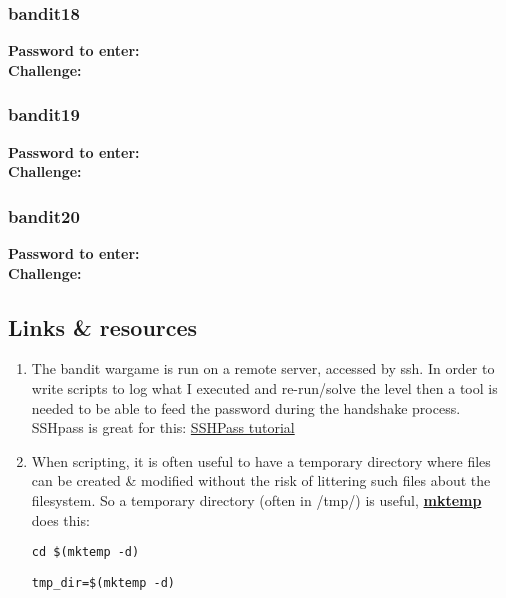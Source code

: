 \documentclass[a4paper]{article}
\newcommand{\pass}[1]{\textbf{Password to enter:} \textit{#1}\\}
\newcommand{\chall}{\textbf{Challenge:} }
\begin{document}
\subsubsection{bandit18}
\pass{ }
\chall 

\subsubsection{bandit19}
\pass{ }
\chall 

\subsubsection{bandit20}
\pass{ }
\chall 

\subsection*{Links \& resources}
\begin{enumerate}
\item The bandit wargame is run on a remote server, accessed by ssh. In order to write scripts to log what I executed and re-run/solve the level then a tool is needed to be able to feed the password during the handshake process. SSHpass is great for this: \href{https://askubuntu.com/questions/224181/how-do-i-include-a-password-with-ssh-command-want-to-make-shell-script}{SSHPass tutorial} 

\item When scripting, it is often useful to have a temporary directory where files can be created \& modified without the risk of littering such files about the filesystem. So a temporary directory (often in /tmp/) is useful, \href{https://code-maven.com/create-temporary-directory-on-linux-using-bash}{\textbf{mktemp}} does this:
	\begin{lstlisting}[title=move to the new temporary directory]
	cd $(mktemp -d)
	\end{lstlisting}
	\begin{lstlisting}[title=store the new temporary directory path]
	tmp_dir=$(mktemp -d)
	\end{lstlisting}
\end{enumerate}
\end{document}
